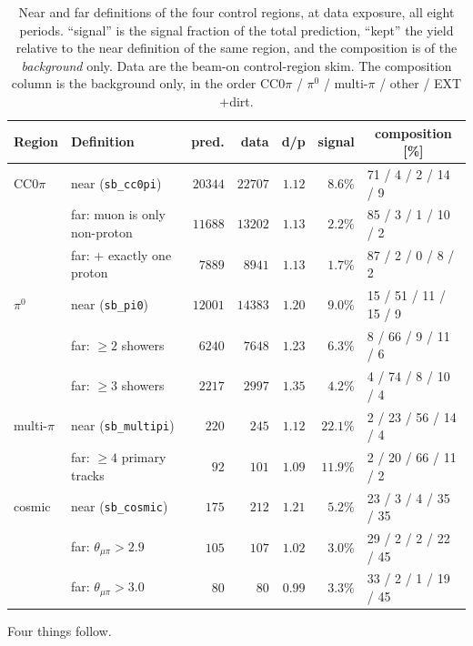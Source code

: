 \documentclass[11pt,a4paper]{article}
\begin{document}
\begin{table}[H]
  \centering
  \caption{Near and far definitions of the four control regions, at data exposure, all eight periods.
    ``signal'' is the signal fraction of the total prediction, ``kept'' the yield relative to the near
    definition of the same region, and the composition is of the \emph{background} only. Data are the
    beam-on control-region skim. The composition column is the background only, in the order
    CC0$\pi$ / $\pi^0$ / multi-$\pi$ / other / EXT$+$dirt.}
  \label{tab:farsb}
  \scriptsize
  \begin{tabular}{llrrrrl}
    \toprule
    Region & Definition & pred. & data & d/p & signal & \multicolumn{1}{c}{composition [\%]} \\
    \midrule
    CC0$\pi$ & near (\texttt{sb\_cc0pi}) & $20344$ & $22707$ & $1.12$ & $8.6\%$ & 71 / 4 / 2 / 14 / 9 \\
      & far: muon is only non-proton & $11688$ & $13202$ & $1.13$ & $\mathbf{2.2\%}$ & 85 / 3 / 1 / 10 / 2 \\
      & far: $+$ exactly one proton & $7889$ & $8941$ & $1.13$ & $\mathbf{1.7\%}$ & 87 / 2 / 0 / 8 / 2 \\
    \midrule
    $\pi^0$ & near (\texttt{sb\_pi0}) & $12001$ & $14383$ & $1.20$ & $9.0\%$ & 15 / 51 / 11 / 15 / 9 \\
      & far: $\geq2$ showers & $6240$ & $7648$ & $1.23$ & $6.3\%$ & 8 / 66 / 9 / 11 / 6 \\
      & far: $\geq3$ showers & $2217$ & $2997$ & $1.35$ & $4.2\%$ & 4 / 74 / 8 / 10 / 4 \\
    \midrule
    multi-$\pi$ & near (\texttt{sb\_multipi}) & $220$ & $245$ & $1.12$ & $22.1\%$ & 2 / 23 / 56 / 14 / 4 \\
      & far: $\geq4$ primary tracks & $92$ & $101$ & $1.09$ & $11.9\%$ & 2 / 20 / 66 / 11 / 2 \\
    \midrule
    cosmic & near (\texttt{sb\_cosmic}) & $175$ & $212$ & $1.21$ & $5.2\%$ & 23 / 3 / 4 / 35 / 35 \\
      & far: $\theta_{\mu\pi}>2.9$ & $105$ & $107$ & $1.02$ & $3.0\%$ & 29 / 2 / 2 / 22 / 45 \\
      & far: $\theta_{\mu\pi}>3.0$ & $80$ & $80$ & $0.99$ & $3.3\%$ & 33 / 2 / 1 / 19 / 45 \\
    \bottomrule
  \end{tabular}
\end{table}

Four things follow.
\end{document}
